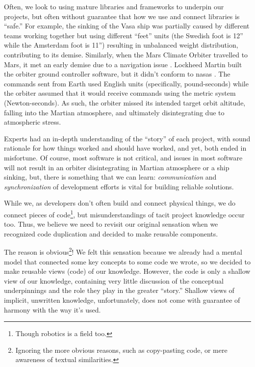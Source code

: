 Often, we look to using mature libraries and frameworks to underpin our
projects, but often without guarantee that how we use and connect libraries is
``safe.'' For example, the sinking of the Vasa ship \cite{wiki:Vasa_ship} was
partially caused by different teams working together but using different
``feet'' units (the Swedish foot is 12'' while the Amsterdam foot is 11'')
resulting in unbalanced weight distribution, contributing to its demise.
Similarly, when the Mars Climate Orbiter travelled to Mars, it met an early
demise due to a navigation issue \cite{Siddiqi2018}. Lockheed Martin built the
orbiter ground controller software, but it didn't conform to \acsp{nasa}
. The commands sent from Earth used English units (specifically,
pound-seconds) while the orbiter assumed that it would receive commands using
the metric system (Newton-seconds). As such, the orbiter missed its intended
target orbit altitude, falling into the Martian atmosphere, and ultimately
disintegrating due to atmospheric stress.

Experts had an in-depth understanding of the ``story'' of each project, with
sound rationale for how things worked and should have worked, and yet, both
ended in misfortune. Of course, most software is not critical, and issues in
most software will not result in an orbiter disintegrating in Martian atmosphere
or a ship sinking, but, there is something that we can learn:
\textit{communication} and \textit{synchronization} of development efforts is
vital for building reliable solutions.

While we, as developers don't often build and connect physical things, we do
connect pieces of code\footnote{Though robotics is a field too.}, but
misunderstandings of tacit project knowledge occur too. Thus, we believe we need
to revisit our original sensation when we recognized code duplication and
decided to make reusable components.

The reason is obvious\footnote{Ignoring the more obvious reasons, such as
copy-pasting code, or mere awareness of textual similarities.}! We felt this
sensation because we already had a mental model that connected some key concepts
to some code we wrote, so we decided to make reusable views (code) of our
knowledge. However, the code is only a shallow view of our knowledge, containing
very little discussion of the conceptual underpinnings and the role they play in
the greater ``story.'' Shallow views of implicit, unwritten knowledge,
unfortunately, does not come with guarantee of harmony with the way it's used.

